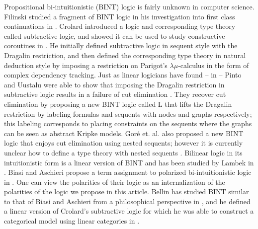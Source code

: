 Propositional bi-intuitionistic (BINT) logic is fairly unknown in
computer science.  Filinski studied a fragment of BINT logic in his
investigation into first class continuations in \cite{Filinski:1989}.
Crolard introduced a logic and corresponding type theory called
subtractive logic, and showed it can be used to study constructive
coroutines in \cite{crolard01,Crolard:2004}.  He initially defined
subtractive logic in sequent style with the Dragalin restriction, and
then defined the corresponding type theory in natural deduction style
by imposing a restriction on Parigot's $\lambda\mu$-calculus in the
form of complex dependency tracking.  Just as linear logicians have
found -- in \cite{Schellinx:1991} -- Pinto and Uustalu were able to
show that imposing the Dragalin restriction in subtractive logic
results in a failure of cut elimination \cite{Pinto:2009}.  They
recover cut elimination by proposing a new BINT logic called L that
lifts the Dragalin restriction by labeling formulas and sequents with
nodes and graphs respectively; this labeling corresponds to placing
constraints on the sequents where the graphs can be seen as abstract
Kripke models. Gor\'e et. al. also proposed a new BINT logic that
enjoys cut elimination using nested sequents; however it is currently
unclear how to define a type theory with nested sequents
\cite{DBLP:conf/aiml/GorePT08}.  Bilinear logic in its intuitionistic
form is a linear version of BINT and has been studied by Lambek in
\cite{Lambek:1993,Lambek:1995}.  Biasi and Aschieri propose a term
assignment to polarized bi-intuitionistic logic in
\cite{Biasi:2008:TAP:2365856.2365859}.  One can view the polarities of
their logic as an internalization of the polarities of the logic we
propose in this article. Bellin has studied BINT similar to that of
Biasi and Aschieri from a philosophical perspective in
\cite{Bellin:2004,Bellin:2005,Bellin:2014}, and he defined a linear
version of Crolard's subtractive logic for which he was able to
construct a categorical model using linear categories in
\cite{Bellin:2012}.

